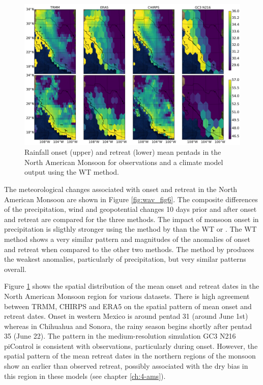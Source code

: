 \begin{figure}[t!]
\centering
 \includegraphics[width=\linewidth]{figures/map_nam_wav.pdf}
\caption[Onset and retreat spatial distribution in North American Monsoon]{ Rainfall onset (upper) and retreat (lower) mean pentads in the North American Monsoon for observations and a climate model output using the WT method.  }
\label{fig:nam_map}
\end{figure}

The meteorological changes associated with onset and retreat in the North American Monsoon are shown in Figure \ref{fig:wav_fig6}. 
The composite differences of the precipitation, wind and geopotential changes 10 days prior and after onset and retreat are compared for the three methods. The impact of monsoon onset in precipitation is sligthly stronger using the method by  than the WT or . 
The WT method shows a very similar pattern and magnitudes of the anomalies of onset and retreat when compared to the other two methods. The method by  produces the weakest anomalies, particularly of precipitation, but very similar patterns overall.

Figure \ref{fig:nam_map} shows the spatial distribution of the mean onset and retreat dates in the North American Monsoon region for various datasets.
There is high agreement between TRMM, CHIRPS and ERA5 on the spatial pattern of mean onset and retreat dates.
Onset in western Mexico is around pentad 31 (around June 1st) whereas in Chihuahua and Sonora, the rainy season begins shortly after pentad 35 (June 22).
The pattern in the medium-resolution simulation GC3 N216 piControl is consistent with observations, particularly during onset.  However, the spatial pattern of the mean retreat dates in the northern regions of the monsoon show an earlier than observed retreat, possibly associated with the dry bias in this region in these models (see chapter \ref{ch:4-ams}).

